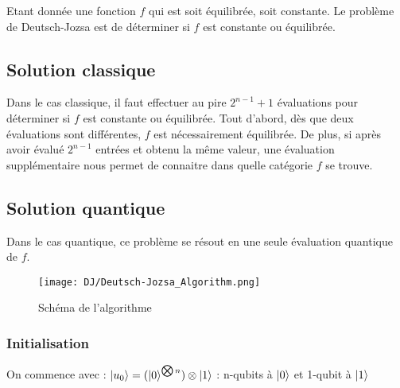 


\begin{pb}
Etant donnée une fonction $f$ qui est soit équilibrée, soit constante.
Le problème de Deutsch-Jozsa est de déterminer si $f$ est constante ou
équilibrée.  
\end{pb}

\subsection{Solution classique}
Dans le cas classique, il faut effectuer au pire $2^{n-1}+1$
évaluations pour déterminer si $f$ est constante ou équilibrée. Tout
d'abord, dès que deux évaluations sont différentes, $f$ est
nécessairement équilibrée. De plus, si après avoir évalué $2^{n-1}$
entrées et obtenu la même valeur, une évaluation supplémentaire nous
permet de connaitre dans quelle catégorie $f$ se trouve.

\subsection{Solution quantique}
Dans le cas quantique, ce problème se résout en une seule évaluation
quantique de $f$.

\begin{figure}[htbp]
    \centering
    \texttt{[image: DJ/Deutsch-Jozsa\_Algorithm.png]}
    \caption{Schéma de l'algorithme}
    \label{fig:univerise}
\end{figure}

\subsubsection{Initialisation}
On commence avec :
$\ket{u_0} = (\ket{0}^{\bigotimes n}) \otimes \ket{1}$
: n-qubits à $\ket{0}$ et 1-qubit à $\ket{1}$

